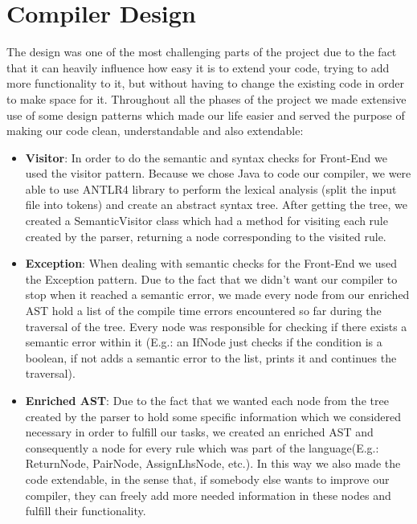 \documentclass[11pt]{article}
\begin{document}
\section{Compiler Design}
\iffalse
THE DESIGN CHOICES(3/4)
1. An analysis of the design choices that you made during the WACC lab
2. Design patterns you used when designing your code and why you chose to use them.
\fi
The design was one of the most challenging parts of the project due to the fact that it can heavily influence how easy it is to extend your code, trying to add more functionality to it, but without having to change the existing code in order to make space for it. Throughout all the phases of the project we made extensive use of some design patterns which made our life easier and served the purpose of making our code clean, understandable and also extendable:
\begin{itemize}[noitemsep,topsep=0pt]
  \item \textbf{Visitor}:
    In order to do the semantic and syntax checks for Front-End we used the visitor pattern. Because we chose Java to code our compiler, we were able to use ANTLR4 library to perform the lexical analysis (split the input file into tokens) and create an abstract syntax tree. After getting the tree, we created a SemanticVisitor class which had a method for visiting each rule created by the parser, returning a node corresponding to the visited rule.
  \item \textbf{Exception}:
    When dealing with semantic checks for the Front-End we used the Exception pattern. Due to the fact that we didn't want our compiler to stop when it reached a semantic error, we made every node from our enriched AST hold a list of the compile time errors encountered so far during the traversal of the tree. Every node was responsible for checking if there exists a semantic error within it (E.g.: an IfNode just checks if the condition is a boolean, if not adds a semantic error to the list, prints it and continues the traversal).
  \item \textbf{Enriched AST}:
    Due to the fact that we wanted each node from the tree created by the parser to hold some specific information which we considered necessary in order to fulfill our tasks, we created an enriched AST and consequently a node for every rule which was part of the language(E.g.: ReturnNode, PairNode, AssignLhsNode, etc.). In this way we also made the code extendable, in the sense that, if somebody else wants to improve our compiler, they can freely add more needed information in these nodes and fulfill their functionality.

\end{itemize}
\end{document}
